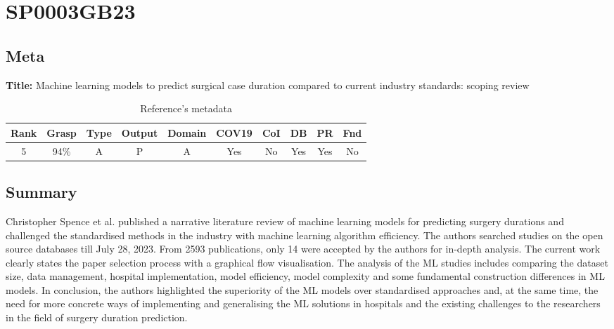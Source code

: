 \section{ SP0003GB23 }


\subsection{Meta}

    \textbf{Title:}
    Machine learning models to predict surgical case duration compared to current industry standards: scoping review

    \begin{table}[H]
        \centering
        \begin{tabular}{|c|c|c|c|c|c|c|c|c|c|}
            \hline
                \textbf{Rank} & \textbf{Grasp} & \textbf{Type} & \textbf{Output} & \textbf{Domain} & \textbf{COV19} & \textbf{CoI} & \textbf{DB} & \textbf{PR} & \textbf{Fnd} \\
            \hline
                5 & 94\% & A & P & A & Yes & No & Yes & Yes & No \\
            \hline
        \end{tabular}
        \caption{Reference's metadata}
        \label{tab:SP0003GB23}
    \end{table}

\subsection{Summary}
Christopher Spence et al. \cite{x084} published a narrative literature review of machine learning models for predicting surgery durations and challenged the standardised methods in the industry with machine learning algorithm efficiency. The authors searched studies on the open source databases till July 28, 2023. From 2593 publications, only 14 were accepted by the authors for in-depth analysis. The current work clearly states the paper selection process with a graphical flow visualisation. The analysis of the ML studies includes comparing the dataset size, data management, hospital implementation, model efficiency, model complexity and some fundamental construction differences in ML models. In conclusion, the authors highlighted the superiority of the ML models over standardised approaches and, at the same time, the need for more concrete ways of implementing and generalising the ML solutions in hospitals and the existing challenges to the researchers in the field of surgery duration prediction.
    

